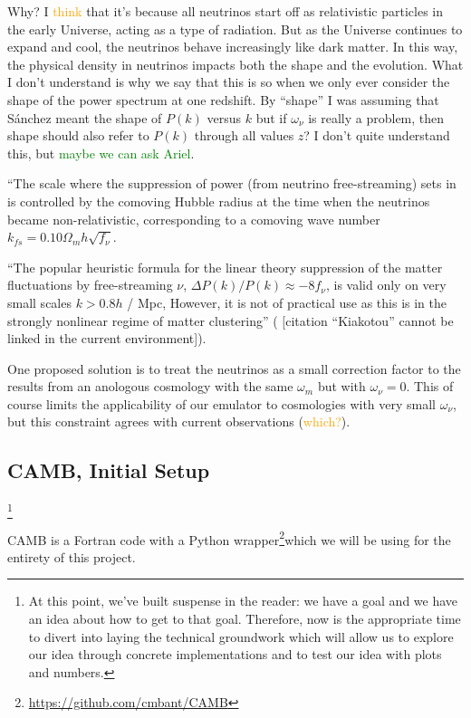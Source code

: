 \documentclass[11pt]{article}
\newcommand{\cbib}[1]
{\IfFileExists{biblatex.sty}
{\cite{#1}}
{[citation ``#1'' cannot be linked in the current environment]}}
\begin{document}
Why? I \textcolor{orange}{think} that it's because all neutrinos start off as
relativistic particles in the early Universe, acting as a type of radiation.
But as the Universe continues to expand and cool, the neutrinos behave
increasingly like dark matter.
In this way, the physical density in neutrinos impacts both the shape and the
evolution. What I don't understand is why we say that this is so when we
only ever consider the shape of the power spectrum at one redshift. By
``shape'' I was assuming that S\'{a}nchez meant the shape of $P(k)$ versus
$k$ but if $\omega_\nu$ is really a problem, then shape should also refer
to $P(k)$ through all values $z$? I don't quite understand this, but
\textcolor{green}{maybe we can ask Ariel}.

``The scale where the suppression of power (from neutrino free-streaming) sets
in is controlled by the comoving Hubble radius at the time when the neutrinos
became non-relativistic, corresponding to a comoving wave number
$k_{fs} = 0.10 \Omega_m h \sqrt{f_\nu}$.

``The popular heuristic formula for the linear theory suppression of the matter
fluctuations by free-streaming $\nu$, $\Delta P(k) / P(k) \approx -8 f_\nu$, is
valid only on very small scales $k > 0.8 h$ / Mpc, However, it is not of
practical use as this is in the strongly nonlinear regime of matter
clustering'' (\cbib{Kiakotou}).

One proposed solution is to treat the neutrinos as a small correction factor
to the results from an anologous cosmology with the same $\omega_m$ but with
$\omega_\nu = 0$. This of course limits the applicability of our emulator to
cosmologies with very small $\omega_\nu$, but this constraint agrees with
current observations (\textcolor{orange}{which?}).


\begin{centering}
\section{CAMB, Initial Setup}
\end{centering}
\footnote{
    At this point, we've built suspense in the reader: we have a goal and
    we have an idea about how to get to that goal. Therefore, now is the
    appropriate time to divert into laying the technical groundwork which
    will allow us to explore our idea through concrete implementations and
    to test our idea with plots and numbers.
}

CAMB is a Fortran code with a Python wrapper\footnote{
\url{https://github.com/cmbant/CAMB}
}which we will be using for the
entirety of this project.
\end{document}
